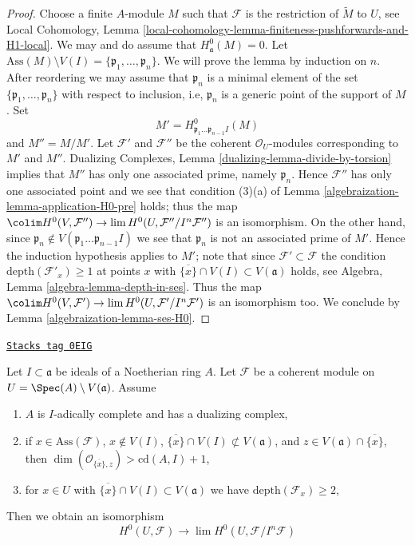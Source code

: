 \begin{proof}
\medskip\noindent
Choose a finite $A$-module $M$ such that $\mathcal{F}$ is the restriction
of $\widetilde{M}$ to $U$, see Local Cohomology, Lemma
\ref{local-cohomology-lemma-finiteness-pushforwards-and-H1-local}.
We may and do assume that $H^0_\mathfrak a(M) = 0$.
Let $\text{Ass}(M) \setminus V(I) = \{\mathfrak p_1, \ldots, \mathfrak p_n\}$.
We will prove the lemma by induction on $n$. After reordering we
may assume that $\mathfrak p_n$ is a minimal element of the set
$\{\mathfrak p_1, \ldots, \mathfrak p_n\}$ with respect to inclusion, i.e,
$\mathfrak p_n$ is a generic point of the support of $M$.
Set
$$
M' = H^0_{\mathfrak p_1 \ldots \mathfrak p_{n - 1} I}(M)
$$
and $M'' = M/M'$. Let $\mathcal{F}'$ and $\mathcal{F}''$ be the
coherent $\mathcal{O}_U$-modules corresponding to $M'$ and $M''$.
Dualizing Complexes, Lemma \ref{dualizing-lemma-divide-by-torsion}
implies that $M''$ has only one associated prime, namely $\mathfrak p_n$.
Hence $\mathcal{F}''$ has only one associated point and
we see that condition (3)(a) of Lemma \ref{algebraization-lemma-application-H0-pre} holds;
thus the map $\colim H^0(V, \mathcal{F}'')
\to \lim H^0(U, \mathcal{F}''/I^n\mathcal{F}'')$ is an isomorphism.
On the other hand, since
$\mathfrak p_n \not \in V(\mathfrak p_1 \ldots \mathfrak p_{n - 1} I)$
we see that $\mathfrak p_n$ is not an associated prime of $M'$.
Hence the induction hypothesis applies to $M'$; note
that since $\mathcal{F}' \subset \mathcal{F}$
the condition $\text{depth}(\mathcal{F}'_x) \geq 1$ at points $x$ with
$\overline{\{x\}} \cap V(I) \subset V(\mathfrak a)$ holds, see
Algebra, Lemma \ref{algebra-lemma-depth-in-ses}.
Thus the map
$\colim H^0(V, \mathcal{F}')
\to \lim H^0(U, \mathcal{F}'/I^n\mathcal{F}')$ is an isomorphism too.
We conclude by Lemma \ref{algebraization-lemma-ses-H0}.
\end{proof}

\begin{lemma}[Application H0]
\label{algebraization-lemma-application-H0}
\href{https://stacks.math.columbia.edu/tag/0EIG}{\texttt{Stacks tag 0EIG}}

Let $I \subset \mathfrak a$ be ideals of a Noetherian ring $A$.
Let $\mathcal{F}$ be a coherent module on
$U = \Spec(A) \setminus V(\mathfrak a)$.
Assume
\begin{enumerate}
\item $A$ is $I$-adically complete and has a dualizing complex,
\item if $x \in \text{Ass}(\mathcal{F})$, $x \not \in V(I)$,
$\overline{\{x\}} \cap V(I) \not \subset V(\mathfrak a)$, and
$z \in V(\mathfrak a) \cap \overline{\{x\}}$, then
$\dim(\mathcal{O}_{\overline{\{x\}}, z}) > \text{cd}(A, I) + 1$,
\item for $x \in U$ with $\overline{\{x\}} \cap V(I) \subset V(\mathfrak a)$
we have $\text{depth}(\mathcal{F}_x) \geq 2$,
\end{enumerate}
Then we obtain an isomorphism
$$
H^0(U, \mathcal{F})
\longrightarrow
\lim H^0(U, \mathcal{F}/I^n\mathcal{F})
$$
\end{lemma}

